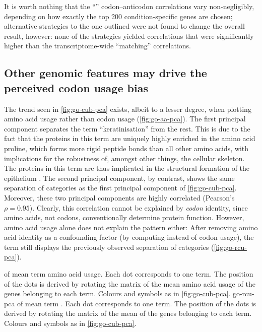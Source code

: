 It is worth nothing that the “” codon--anticodon correlations vary
non-negligibly, depending on how exactly the top \num{200} condition-specific
genes are chosen; alternative strategies to the one outlined were not found to
change the overall result, however: none of the strategies yielded correlations
that were significantly higher than the transcriptome-wide “matching”
correlations.

\subsection{Other genomic features may drive the perceived codon usage bias}

The trend seen in \cref{fig:go-cub-pca} exists, albeit to a lesser degree, when
plotting amino acid usage rather than codon usage (\cref{fig:go-aa-pca}). The
first principal component separates the \go term “keratinisation” from the rest.
This is due to the fact that the proteins in this \go term are uniquely highly
enriched in the amino acid proline, which forms more rigid peptide bonds than
all other amino acids, with implications for the robustness of, amongst other
things, the cellular skeleton. The proteins in this \go term are thus implicated
in the structural formation of the epithelium \citep{Hohl:1995}. The second
principal component, by contrast, shows the same separation of \go categories as
the first principal component of \cref{fig:go-cub-pca}. Moreover, these two
principal components are highly correlated (Pearson’s \(\rho = 0.95\)). Clearly,
this correlation cannot be explained by \emph{codon} identity, since amino
acids, not codons, conventionally determine protein function. However, amino
acid usage alone does not explain the pattern either: After removing amino acid
identity as a confounding factor (by computing \rcu instead of codon usage), the
\go term \pca still displays the previously observed separation of \go
categories (\cref{fig:go-rcu-pca}).

    {\pca of mean \go term amino acid usage.}
    {Each dot corresponds to one \go term. The position of the dots is derived
    by rotating the matrix of the mean amino acid usage of the genes belonging
    to each \go term. Colours and symbols as in \cref{fig:go-cub-pca}.}
    {go-rcu-pca}
    {\pca of mean \go term \rcu.}
    {Each dot corresponds to one \go term. The position of the dots is derived
    by rotating the matrix of the mean \rcu of the genes belonging to each \go
    term. Colours and symbols as in \cref{fig:go-cub-pca}.}

